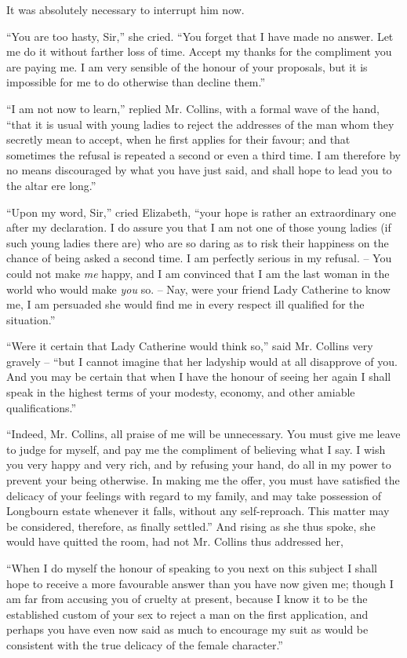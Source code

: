 It was absolutely necessary to interrupt him now.

“You are too hasty, Sir,” she cried. “You forget that
I have made no answer. Let me do it without farther
loss of time. Accept my thanks for the compliment you
are paying me. I am very sensible of the honour of your
proposals, but it is impossible for me to do otherwise
than decline them.”

“I am not now to learn,” replied Mr. Collins, with
a formal wave of the hand, “that it is usual with young
ladies to reject the addresses of the man whom they
secretly mean to accept, when he first applies for their
favour; and that sometimes the refusal is repeated a
second or even a third time. I am therefore by no means
discouraged by what you have just said, and shall hope
to lead you to the altar ere long.”

“Upon my word, Sir,” cried Elizabeth, “your hope is
rather an extraordinary one after my declaration. I do
assure you that I am not one of those young ladies (if such
young ladies there are) who are so daring as to risk their
happiness on the chance of being asked a second time.
I am perfectly serious in my refusal. -- You could not
make \textit{me} happy, and I am convinced that I am the last
woman in the world who would make \textit{you} so. -- Nay, were
your friend Lady Catherine to know me, I am persuaded
she would find me in every respect ill qualified for the
situation.”

“Were it certain that Lady Catherine would think so,”
said Mr. Collins very gravely -- “but I cannot imagine
that her ladyship would at all disapprove of you. And
you may be certain that when I have the honour of seeing
her again I shall speak in the highest terms of your
modesty, economy, and other amiable qualifications.”

“Indeed, Mr. Collins, all praise of me will be unnecessary.
You must give me leave to judge for myself, and
pay me the compliment of believing what I say. I wish
you very happy and very rich, and by refusing your hand,
do all in my power to prevent your being otherwise. In
making me the offer, you must have satisfied the delicacy
of your feelings with regard to my family, and may take
possession of Longbourn estate whenever it falls, without
any self-reproach. This matter may be considered,
therefore, as finally settled.” And rising as she thus spoke, she
would have quitted the room, had not Mr. Collins thus
addressed her,

“When I do myself the honour of speaking to you
next on this subject I shall hope to receive a more favourable
answer than you have now given me; though I am
far from accusing you of cruelty at present, because
I know it to be the established custom of your sex to reject
a man on the first application, and perhaps you have even
now said as much to encourage my suit as would be consistent
with the true delicacy of the female character.”

